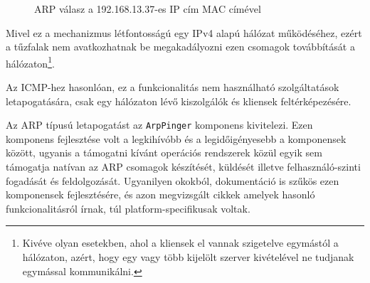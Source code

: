 \documentclass[a4paper,12pt]{article}
\newcounter{subsubsubsection}[subsubsection]
\begin{document}
	\begin{figure}[!htbp]
		\centering
		\caption{ARP válasz a 192.168.13.37-es IP cím MAC címével}
		\label{arpresp}
	\end{figure}

	Mivel ez a mechanizmus létfontosságú egy IPv4 alapú hálózat működéséhez, ezért a tűzfalak nem avatkozhatnak be megakadályozni ezen csomagok továbbítását a hálózaton\footnote{Kivéve olyan esetekben, ahol a kliensek el vannak szigetelve egymástól a hálózaton, azért, hogy egy vagy több kijelölt szerver kivételével ne tudjanak egymással kommunikálni.}.
	
	Az ICMP-hez hasonlóan, ez a funkcionalitás nem használható szolgáltatások letapogatására, csak egy hálózaton lévő kiszolgálók és kliensek feltérképezésére.
	

	Az ARP típusú letapogatást az \texttt{ArpPinger} komponens kivitelezi. Ezen komponens fejlesztése volt a legkihívóbb és a legidőigényesebb a komponensek között, ugyanis a támogatni kívánt operációs rendszerek közül egyik sem támogatja natívan az ARP csomagok készítését, küldését illetve felhasználó-szinti fogadását és feldolgozását. Ugyanilyen okokból, dokumentáció is szűkös ezen komponensek fejlesztésére, és azon megvizsgált cikkek amelyek hasonló funkcionalitásról írnak, túl platform-specifikusak voltak.
	
\end{document}
